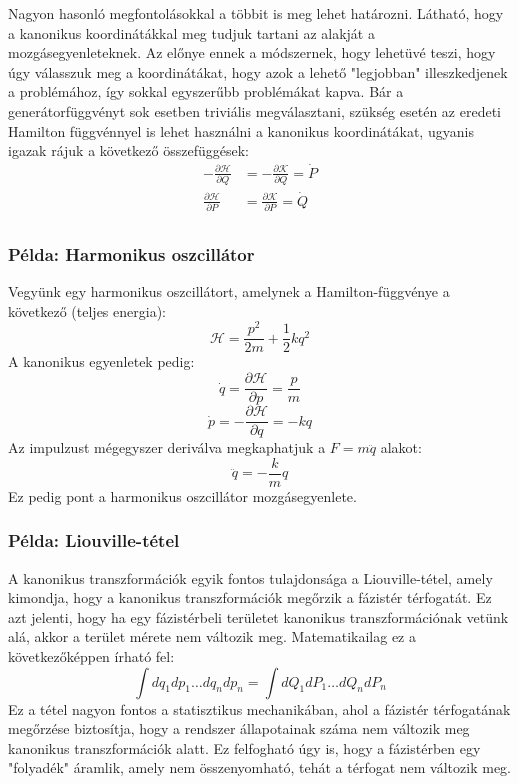 \documentclass[../main.tex]{subfiles}
\begin{document}
Nagyon hasonló megfontolásokkal a többit is meg lehet határozni. Látható, hogy a kanonikus koordinátákkal meg tudjuk tartani az alakját a mozgásegyenleteknek. Az előnye ennek a módszernek, hogy lehetüvé teszi, hogy úgy válasszuk meg a koordinátákat, hogy azok a lehető "legjobban" illeszkedjenek a problémához, így sokkal egyszerűbb problémákat kapva. Bár a generátorfüggvényt sok esetben triviális megválasztani, szükség esetén az eredeti Hamilton függvénnyel is lehet használni a kanonikus koordinátákat, ugyanis igazak rájuk a következő összefüggések:
\begin{equation}
    \begin{aligned}
        -\frac{\partial \mathcal{H}}{\partial Q} &= -\frac{\partial \mathcal{K}}{\partial Q} = \dot{P} \\
        \frac{\partial \mathcal{H}}{\partial P} &= \frac{\partial \mathcal{K}}{\partial P} = \dot{Q} \\
    \end{aligned}
\end{equation}

\subsubsection*{Példa: Harmonikus oszcillátor}
Vegyünk egy harmonikus oszcillátort, amelynek a Hamilton-függvénye a következő (teljes energia):
\begin{equation}
    \mathcal{H} = \frac{p^2}{2m} + \frac{1}{2}k q^2
\end{equation}
A kanonikus egyenletek pedig:
\begin{equation}
    \dot{q} = \frac{\partial \mathcal{H}}{\partial p} = \frac{p}{m}
\end{equation}
\begin{equation}
    \dot{p} = -\frac{\partial \mathcal{H}}{\partial q} = -k q
\end{equation}
Az impulzust mégegyszer deriválva megkaphatjuk a $F = m\ddot{q}$ alakot:
\begin{equation}
    \ddot{q} = -\frac{k}{m} q
\end{equation}
Ez pedig pont a harmonikus oszcillátor mozgásegyenlete.

\subsubsection*{Példa: Liouville-tétel}
A kanonikus transzformációk egyik fontos tulajdonsága a Liouville-tétel, amely kimondja, hogy a kanonikus transzformációk megőrzik a fázistér térfogatát. Ez azt jelenti, hogy ha egy fázistérbeli területet kanonikus transzformációnak vetünk alá,
akkor a terület mérete nem változik meg. Matematikailag ez a következőképpen írható fel:
\begin{equation}
    \int dq_1 dp_1 \ldots dq_n dp_n = \int dQ_1 dP_1 \ldots dQ_n dP_n
\end{equation}
Ez a tétel nagyon fontos a statisztikus mechanikában, ahol a fázistér térfogatának megőrzése biztosítja, hogy a rendszer állapotainak száma nem változik meg kanonikus transzformációk alatt. Ez felfogható úgy is,
hogy a fázistérben egy "folyadék" áramlik, amely nem összenyomható, tehát a térfogat nem változik meg.
\end{document}
